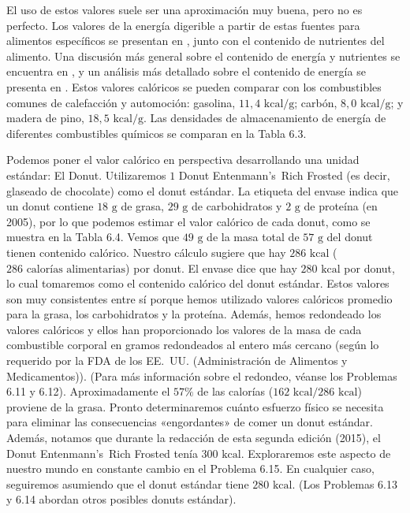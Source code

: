 \documentclass[12pt]{book}
\begin{document}
El uso de estos valores suele ser una aproximación muy buena, pero no es perfecto. Los valores de la energía digerible a partir de estas fuentes para alimentos específicos se presentan en \cite{100}, junto con el contenido de nutrientes del alimento. Una discusión más general sobre el contenido de energía y nutrientes se encuentra en \cite{23}, y un análisis más detallado sobre el contenido de energía se presenta en \cite{6,68}. Estos valores calóricos se pueden comparar con los combustibles comunes de calefacción y automoción: gasolina, $11,4\text{ kcal/g}$; carbón, $8,0\text{ kcal/g}$; y madera de pino, $18,5\text{ kcal/g}$. Las densidades de almacenamiento de energía de diferentes combustibles químicos se comparan en la Tabla 6.3.

Podemos poner el valor calórico en perspectiva desarrollando una unidad estándar: El Donut. Utilizaremos $1$ Donut Entenmann's\texttrademark\ Rich Frosted (es decir, glaseado de chocolate) como el donut estándar. La etiqueta del envase indica que un donut contiene $18\text{ g}$ de grasa, $29\text{ g}$ de carbohidratos y $2\text{ g}$ de proteína (en 2005), por lo que podemos estimar el valor calórico de cada donut, como se muestra en la Tabla 6.4. Vemos que $49\text{ g}$ de la masa total de $57\text{ g}$ del donut tienen contenido calórico. Nuestro cálculo sugiere que hay $286\text{ kcal}$ ($286\text{ calorías alimentarias}$) por donut. El envase dice que hay $280\text{ kcal}$ por donut, lo cual tomaremos como el contenido calórico del donut estándar. Estos valores son muy consistentes entre sí porque hemos utilizado valores calóricos promedio para la grasa, los carbohidratos y la proteína. Además, hemos redondeado los valores calóricos y ellos han proporcionado los valores de la masa de cada combustible corporal en gramos redondeados al entero más cercano (según lo requerido por la FDA de los EE.~UU. (Administración de Alimentos y Medicamentos)). (Para más información sobre el redondeo, véanse los Problemas 6.11 y 6.12). Aproximadamente el $57\%$ de las calorías ($162\text{ kcal}/286\text{ kcal}$) proviene de la grasa. Pronto determinaremos cuánto esfuerzo físico se necesita para eliminar las consecuencias «engordantes» de comer un donut estándar. Además, notamos que durante la redacción de esta segunda edición (2015), el Donut Entenmann's\texttrademark\ Rich Frosted tenía $300\text{ kcal}$. Exploraremos este aspecto de nuestro mundo en constante cambio en el Problema 6.15. En cualquier caso, seguiremos asumiendo que el donut estándar tiene $280\text{ kcal}$. (Los Problemas 6.13 y 6.14 abordan otros posibles donuts estándar).
\end{document}
